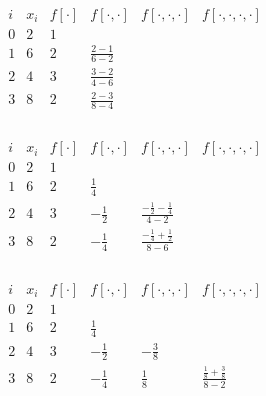 \documentclass{report}
\begin{document}
\begin{itemize}
\bigbreak \noindent 
\begin{align*}
    \begin{array}{c|c|cccc}
        i & x_i & f[\cdot] & f[\cdot,\cdot] & f[\cdot,\cdot,\cdot] & f[\cdot,\cdot,\cdot,\cdot] \\
        \hline
        0 & 2 & 1 &  &  \\
        1 & 6 & 2 & \frac{2-1}{6-2} &  \\
        2 & 4 & 3 & \frac{3-2}{4-6} &  & \\
        3 & 8 & 2 & \frac{2-3}{8-4} &  &  \\
    \end{array}
\end{align*}

\begin{align*}
    \begin{array}{c|c|cccc}
        i & x_i & f[\cdot] & f[\cdot,\cdot] & f[\cdot,\cdot,\cdot] & f[\cdot,\cdot,\cdot,\cdot] \\
        \hline
        0 & 2 & 1 &  &  \\
        1 & 6 & 2 & \frac{1}{4} &  \\
        2 & 4 & 3 & -\frac{1}{2} & \frac{-\frac12 - \frac14}{4-2} & \\
        3 & 8 & 2 & -\frac{1}{4} & \frac{-\frac14 + \frac12}{8-6} &  \\
    \end{array}
\end{align*}

\begin{align*}
    \begin{array}{c|c|cccc}
        i & x_i & f[\cdot] & f[\cdot,\cdot] & f[\cdot,\cdot,\cdot] & f[\cdot,\cdot,\cdot,\cdot] \\
        \hline
        0 & 2 & 1 &  &  \\
        1 & 6 & 2 & \frac{1}{4} &  \\
        2 & 4 & 3 & -\frac{1}{2} & -\frac38 & \\
        3 & 8 & 2 & -\frac{1}{4} & \frac18 & \frac{\frac18 + \frac38}{8-2} \\
    \end{array}
\end{align*}


\end{itemize}
\end{document}
